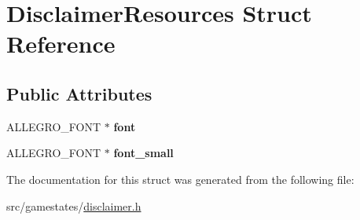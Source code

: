 \hypertarget{structDisclaimerResources}{\section{Disclaimer\+Resources Struct Reference}
\label{structDisclaimerResources}
}
\subsection*{Public Attributes}
\begin{DoxyCompactItemize}
\item 
\hypertarget{structDisclaimerResources_ae81f709fc310ff3b671e7a755fbeac12}{A\+L\+L\+E\+G\+R\+O\+\_\+\+F\+O\+N\+T $\ast$ {\bfseries font}}\label{structDisclaimerResources_ae81f709fc310ff3b671e7a755fbeac12}

\item 
\hypertarget{structDisclaimerResources_aae2af08d2c8f019cf0dcf2379554a900}{A\+L\+L\+E\+G\+R\+O\+\_\+\+F\+O\+N\+T $\ast$ {\bfseries font\+\_\+small}}\label{structDisclaimerResources_aae2af08d2c8f019cf0dcf2379554a900}

\end{DoxyCompactItemize}


The documentation for this struct was generated from the following file\+:\begin{DoxyCompactItemize}
\item 
src/gamestates/\hyperlink{disclaimer_8h}{disclaimer.\+h}\end{DoxyCompactItemize}
